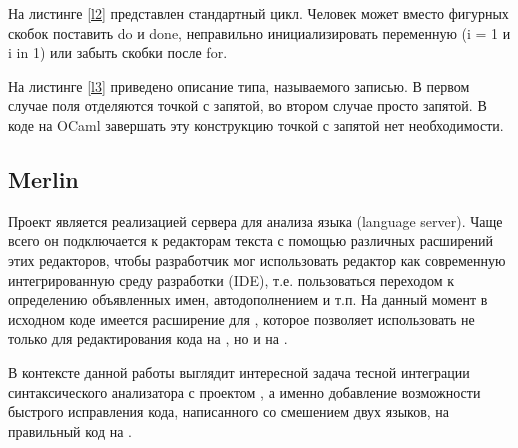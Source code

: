 \hfill


\begin{example}
	\begin{subexample}{0.5\textwidth}
		
		\caption{}
	\end{subexample}
	\begin{subexample}{0.5\textwidth}
		
		\caption{}
	\end{subexample}
\caption{}\label{l2}
\end{example}

На листинге \ref{l2} представлен стандартный цикл. Человек может вместо фигурных скобок поставить do и done, неправильно инициализировать переменную (i = 1 и i in 1) или забыть скобки после for.


\hfill


\begin{example}
	\begin{subexample}{0.5\textwidth}
		
		\caption{}
	\end{subexample}
	\begin{subexample}{0.5\textwidth}
		
		\caption{}
	\end{subexample}
\caption{}\label{l3}
\end{example}

На листинге \ref{l3} приведено описание типа, называемого записью. В первом случае поля отделяются точкой с запятой, во втором случае просто запятой. В коде на OCaml завершать эту конструкцию точкой с запятой нет необходимости.

\subsection{Merlin}

Проект \merlin{}\cite{mer} является реализацией сервера для анализа языка \OCaml{} (language server). Чаще всего он подключается к редакторам текста с помощью различных расширений этих редакторов, чтобы разработчик мог использовать редактор как современную интегрированную среду разработки (IDE), т.е. пользоваться переходом к определению объявленных имен, автодополнением и т.п. На данный момент в исходном коде \ReasonML{} имеется расширение для \merlin{}, которое позволяет использовать \merlin{} не только для редактирования кода на \OCaml{}, но и на \ReasonML{}.

В контексте данной работы выглядит интересной задача тесной интеграции синтаксического анализатора с проектом \merlin{}, а именно добавление возможности быстрого исправления кода, написанного со смешением двух языков, на правильный код на \ReasonML{}.



